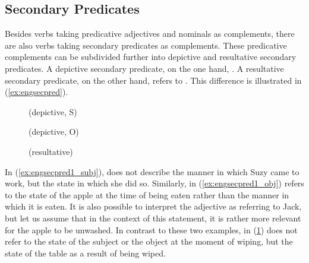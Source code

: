 
\subsection{Secondary Predicates}
\label{subsec:secpred}

Besides verbs taking predicative adjectives and nominals as complements, there
are also verbs taking secondary predicates as complements. These predicative
complements can be subdivided further into depictive and resultative secondary
predicates. A depictive secondary predicate, on the
one hand, . A resultative secondary predicate, on
the other hand, refers to . This difference is
illustrated in (\ref{ex:engsecpred}).

\begin{figure}
\pex\label{ex:engsecpred}
\a\label{ex:engsecpred1_subj}%
	 (depictive, S)

\a\label{ex:engsecpred1_obj}%
	 (depictive, O)

\a\label{ex:engsecpred2_obj}%
	 (resultative)
\xe
\end{figure}

In (\ref{ex:engsecpred1_subj}),  does not describe the manner in which
Suzy came to work, but the state in which she did so. Similarly,
 in (\ref{ex:engsecpred1_obj}) refers to the state of the apple at
the time of being eaten rather than the manner in which it is eaten. It is also
possible to interpret the adjective as referring to Jack, but let us assume
that in the context of this statement, it is rather more relevant for the
apple to be unwashed. In contrast to these two examples,  in
(\ref{ex:engsecpred2_obj}) does not refer to the state of the subject or the
object at the moment of wiping, but the state of the table as a result of being
wiped.

